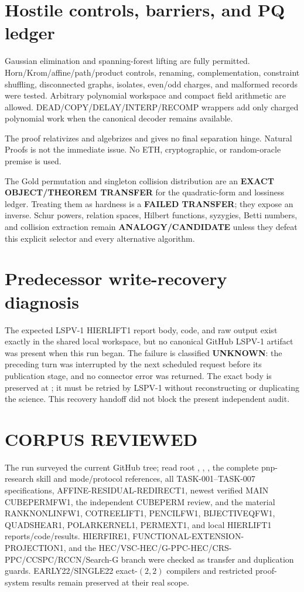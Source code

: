 \documentclass[11pt]{article}
\begin{document}
\section{Hostile controls, barriers, and PQ ledger}
Gaussian elimination and spanning-forest lifting are fully permitted.
Horn/Krom/affine/path/product controls, renaming, complementation, constraint
shuffling, disconnected graphs, isolates, even/odd charges, and malformed
records were tested.  Arbitrary polynomial workspace and compact field
arithmetic are allowed.  DEAD/COPY/DELAY/INTERP/RECOMP wrappers add only
charged polynomial work when the canonical decoder remains available.

The proof relativizes and algebrizes and gives no final separation hinge.
Natural Proofs is not the immediate issue.  No ETH, cryptographic, or
random-oracle premise is used.

The Gold permutation and singleton collision distribution are an
\textbf{EXACT OBJECT/THEOREM TRANSFER} for the quadratic-form and lossiness
ledger.  Treating them as hardness is a \textbf{FAILED TRANSFER}; they expose
an inverse.  Schur powers, relation spaces, Hilbert functions, syzygies,
Betti numbers, and collision extraction remain \textbf{ANALOGY/CANDIDATE}
unless they defeat this explicit selector and every alternative algorithm.

\section{Predecessor write-recovery diagnosis}
The expected LSPV-1 HIERLIFT1 report body, code, and raw output exist exactly
in the shared local workspace, but no canonical GitHub LSPV-1 artifact was
present when this run began.  The failure is classified \textbf{UNKNOWN}:
the preceding turn was interrupted by the next scheduled request before its
publication stage, and no connector error was returned.  The exact body is
preserved at
; it must
be retried by LSPV-1 without reconstructing or duplicating the science.  This
recovery handoff did not block the present independent audit.

\section{CORPUS REVIEWED}
The run surveyed the current GitHub tree; read root ,
, , the complete pnp-research skill and
mode/protocol references, all TASK-001--TASK-007 specifications,
AFFINE-RESIDUAL-REDIRECT1, newest verified MAIN CUBEPERMFW1, the independent
CUBEPERM review, and the material RANKNONLINFW1, COTREELIFT1, PENCILFW1,
BIJECTIVEQFW1, QUADSHEAR1, POLARKERNEL1, PERMEXT1, and local HIERLIFT1
reports/code/results.  HIERFIRE1, FUNCTIONAL-EXTENSION-PROJECTION1, and the
HEC/VSC-HEC/G-PPC-HEC/CRS-PPC/CCSPC/RCCN/Search-G branch were checked as
transfer and duplication guards.  EARLY22/SINGLE22 exact-$(2,2)$ compilers
and restricted proof-system results remain preserved at their real scope.
\end{document}
